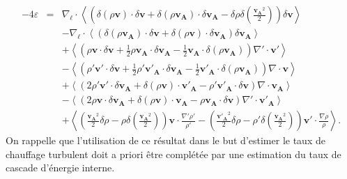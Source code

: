 \begin{eqnarray}
\label{eq:turb_elisop_f2}-4\varepsilon &=& \nabla_{\boldsymbol{\ell}} \cdot \left<\left(\delta \left(\rho\boldsymbol{v}\right) \cdot \delta \boldsymbol{v}+ \delta \left(\rho\boldsymbol{v_A}\right) \cdot \delta \boldsymbol{v_A} - \delta \rho  \delta \left(\frac{\boldsymbol{v_A}^2}{2}\right)\right) \delta \boldsymbol{v}  \right> \\
&&-\nabla_{\boldsymbol{\ell}} \cdot \left< \left(\delta \left(\rho\boldsymbol{v_A}\right) \cdot \delta \boldsymbol{v}  + \delta \left(\rho\boldsymbol{v}\right) \cdot \delta \boldsymbol{v_A}  \right) \delta \boldsymbol{v_A} \right> \nonumber\\
&& +\left< \left(\rho \boldsymbol{v} \cdot \delta \boldsymbol{v} +\frac{1}{2} \rho \boldsymbol{v_A} \cdot \delta \boldsymbol{v_A} -\frac{1}{2} \boldsymbol{v_A} \cdot \delta \left(\rho \boldsymbol{v_A}\right) \right) \nabla' \cdot \boldsymbol{v'} \right>\nonumber\\
&& -\left< \left(\rho' \boldsymbol{v'} \cdot \delta \boldsymbol{v} +\frac{1}{2} \rho' \boldsymbol{v'_A} \cdot \delta \boldsymbol{v_A} -\frac{1}{2} \boldsymbol{v'_A} \cdot \delta \left(\rho \boldsymbol{v_A}\right)  \right)\nabla \cdot \boldsymbol{v}\right>\nonumber\\
&&+ \left<\left(2 \rho' \boldsymbol{v'} \cdot \delta \boldsymbol{v_A}+ \delta\left(\rho \boldsymbol{v}\right) \cdot \boldsymbol{v'_A} - \rho' \boldsymbol{v'_A} \cdot \delta \boldsymbol{v}  \right)\nabla \cdot \boldsymbol{v_A}\right>\nonumber\\
&&- \left<\left(2\rho \boldsymbol{v} \cdot \delta \boldsymbol{v_A} + \delta\left(\rho \boldsymbol{v}\right) \cdot \boldsymbol{v_A} - \rho \boldsymbol{v_A} \cdot \delta \boldsymbol{v}  \right)\nabla' \cdot \boldsymbol{v'_A}\right>\nonumber \\
&&+  \left< \left(\frac{\boldsymbol{v_A}^2}{2} \delta \rho - \rho \delta \left(\frac{\boldsymbol{v_A}^2}{2}\right)  \right)\boldsymbol{v} \cdot \frac{\nabla' \rho'}{\rho'}- \left(\frac{\boldsymbol{v'_A}^2}{2} \delta \rho - \rho' \delta \left(\frac{\boldsymbol{v_A}^2}{2} \right)  \right)  \boldsymbol{v'} \cdot \frac{\nabla \rho}{\rho} \right> .\nonumber
\end{eqnarray} 
On rappelle que l'utilisation de ce résultat dans le but d'estimer le taux de chauffage turbulent doit a priori être complétée par une estimation du taux de cascade d'énergie interne.

